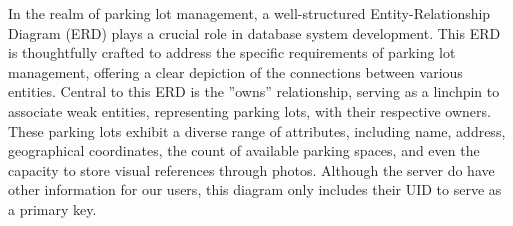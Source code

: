 \begin{figure}[H]
    \centering
    \hspace{1cm}
\end{figure}


In the realm of parking lot management, a well-structured Entity-Relationship Diagram (ERD) plays a crucial role in database system development. This ERD is thoughtfully crafted to address the specific requirements of parking lot management, offering a clear depiction of the connections between various entities. Central to this ERD is the ”owns” relationship, serving as a linchpin to associate weak entities, representing parking lots, with their respective owners. These parking lots exhibit a diverse range of attributes, including name, address, geographical coordinates, the count of available parking spaces, and even the capacity to store visual references through photos. Although the server do have other information for our users, this diagram only includes their UID to serve as a primary key.

